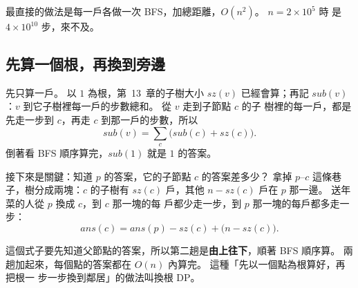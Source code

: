 最直接的做法是每一戶各做一次 BFS，加總距離，$O(n^2)$。 $n = 2 \times 10^5$ 時
是 $4 \times 10^{10}$ 步，來不及。

\subsection{先算一個根，再換到旁邊}

先只算一戶。 以 $1$ 為根，第~13~章的子樹大小 $\mathit{sz}(v)$ 已經會算；再記
$\mathit{sub}(v)$：$v$ 到它子樹裡每一戶的步數總和。 從 $v$ 走到子節點 $c$ 的子
樹裡的每一戶，都是先走一步到 $c$，再走 $c$ 到那一戶的步數，所以
\[
\mathit{sub}(v) = \sum_c \bigl(\mathit{sub}(c) + \mathit{sz}(c)\bigr).
\]
倒著看 BFS 順序算完，$\mathit{sub}(1)$ 就是 $1$ 的答案。

接下來是關鍵：知道 $p$ 的答案，它的子節點 $c$ 的答案差多少？ 拿掉
$p$--$c$ 這條巷子，樹分成兩塊：$c$ 的子樹有 $\mathit{sz}(c)$ 戶，其他 $n -
\mathit{sz}(c)$ 戶在 $p$ 那一邊。 送年菜的人從 $p$ 換成 $c$，到 $c$ 那一塊的每
戶都少走一步，到 $p$ 那一塊的每戶都多走一步：
\[
\mathit{ans}(c) = \mathit{ans}(p) - \mathit{sz}(c) + \bigl(n - \mathit{sz}(c)\bigr).
\]

\begin{center}
\label{fig:tdp-reroot}
\end{center}

這個式子要先知道父節點的答案，所以第二趟是\textbf{由上往下}，順著 BFS 順序算。
兩趟加起來，每個點的答案都在 $O(n)$ 內算完。 這種「先以一個點為根算好，再把根一
步一步換到鄰居」的做法叫換根 DP。

